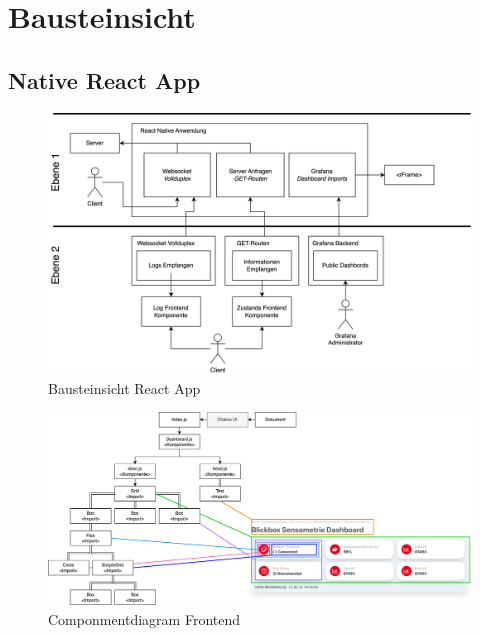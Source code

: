 \documentclass[
]{article}
\begin{document}
\section{Bausteinsicht}

\subsection{Native React App}
\begin{figure}[H]
	\centering
	\includegraphics[width=160mm]{resources/BausteinsichtValentin.drawio.png}
	\caption{Bausteinsicht React App}
	\label{fig:BausteinFrontend}
\end{figure}  

\begin{figure}[H]
	\centering
	\includegraphics[width=160mm]{resources/fecomponentsdiagr.drawio.png}
	\caption{Componmentdiagram Frontend}
	\label{fig:CPFrontent}
\end{figure}
\end{document}
